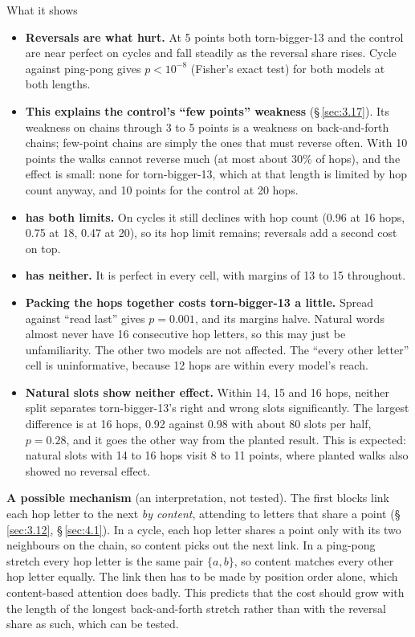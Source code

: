 \documentclass[paper=a4,fontsize=11pt,DIV=11,parskip=half,headings=small,numbers=noendperiod]{scrartcl}
\DeclareRobustCommand{\lead}[1]{\textsf{\bfseries\color{accent}#1}}
\DeclareRobustCommand{\code}[1]{{\fontseries{m}\ttfamily #1}}
\begin{document}
\begin{findbox}{What it shows}
\begin{itemize}
\item \lead{Reversals are what hurt.} At 5 points both \code{torn-\allowbreak{}bigger-\allowbreak{}13} and the
  control are near perfect on cycles and fall steadily as the reversal share rises. Cycle against ping-pong
  gives $p<10^{-8}$ (Fisher’s exact test) for both models at both lengths.
\item \lead{This explains the control’s “few points” weakness} (\S\,\ref{sec:3.17}). Its weakness on chains
  through 3 to 5 points is a weakness on back-and-forth chains; few-point chains are simply the ones that must
  reverse often. With 10 points the walks cannot reverse much (at most about 30\% of hops), and the effect is
  small: none for \code{torn-\allowbreak{}bigger-\allowbreak{}13}, which at that length is limited by hop count
  anyway, and 10 points for the control at 20 hops.
\item \lead{\code{torn-\allowbreak{}bigger-\allowbreak{}13} has both limits.} On cycles it still declines with
  hop count (0.96 at 16 hops, 0.75 at 18, 0.47 at 20), so its hop limit remains; reversals add a second cost on
  top.
\item \lead{\code{g\_\allowbreak{}plant10} has neither.} It is perfect in every cell, with margins of 13 to 15
  throughout.
\item \lead{Packing the hops together costs \code{torn-\allowbreak{}bigger-\allowbreak{}13} a little.} Spread
  against “read last” gives $p=0.001$, and its margins halve. Natural words almost never have 16 consecutive hop
  letters, so this may just be unfamiliarity. The other two models are not affected. The “every other letter”
  cell is uninformative, because 12 hops are within every model’s reach.
\item \lead{Natural slots show neither effect.} Within 14, 15 and 16 hops, neither split separates
  \code{torn-\allowbreak{}bigger-\allowbreak{}13}’s right and wrong slots significantly. The largest difference
  is at 16 hops, 0.92 against 0.98 with about 80 slots per half, $p=0.28$, and it goes the other way from the
  planted result. This is expected: natural slots with 14 to 16 hops visit 8 to 11 points, where planted walks
  also showed no reversal effect.
\end{itemize}
\end{findbox}

\lead{A possible mechanism} (an interpretation, not tested). The first blocks link each hop letter to the next
\emph{by content}, attending to letters that share a point (\S\,\ref{sec:3.12}, \S\,\ref{sec:4.1}). In a cycle,
each hop letter shares a point only with its two neighbours on the chain, so content picks out the next link. In
a ping-pong stretch every hop letter is the same pair $\{a,b\}$, so content matches every other hop letter
equally. The link then has to be made by position order alone, which content-based attention does badly. This
predicts that the cost should grow with the length of the longest back-and-forth stretch rather than with the
reversal share as such, which can be tested.
\end{document}
